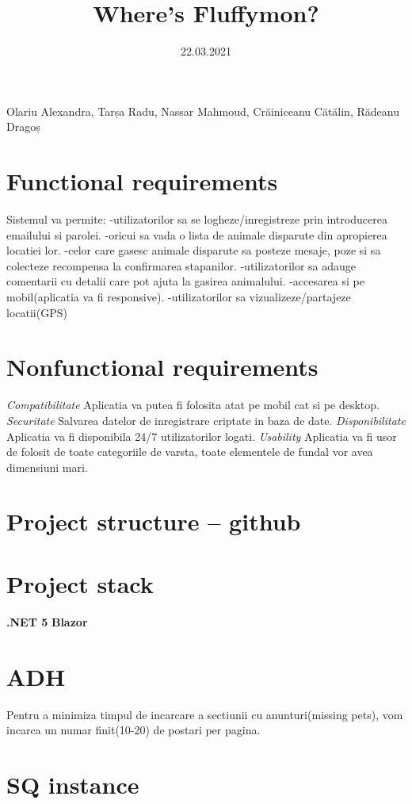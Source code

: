 \documentclass[a4paper,12pt]{article}
\begin{document}
\title{Where's Fluffymon?}
\date{ 22.03.2021}
\maketitle
\begin{center}
Olariu Alexandra, Tarșa Radu, Nassar Mahmoud, Crăiniceanu Cătălin,  Rădeanu Dragoș
\end{center}
\section{Functional requirements}
Sistemul va permite:
\newline
-utilizatorilor sa se logheze/inregistreze prin introducerea emailului si parolei.\newline
-oricui sa  vada o lista de animale disparute din apropierea locatiei lor.
\newline
-celor care gasesc animale disparute sa posteze mesaje, poze si sa colecteze recompensa la confirmarea stapanilor.
\newline
-utilizatorilor sa adauge comentarii cu detalii care pot ajuta la gasirea animalului.
\newline
-accesarea si pe mobil(aplicatia va fi responsive).
\newline
-utilizatorilor sa vizualizeze/partajeze locatii(GPS)

\section{Nonfunctional requirements}
\emph{Compatibilitate}\newline
Aplicatia va putea fi folosita atat pe mobil cat si pe desktop.
\newline
\emph{Securitate}\newline
Salvarea datelor de inregistrare criptate in baza de date.
\newline
\emph{Disponibilitate}\newline
Aplicatia va fi disponibila 24/7 utilizatorilor logati.
\newline
\emph{Usability}\newline
Aplicatia va fi usor de folosit de toate categoriile de varsta, toate elementele de fundal vor avea dimensiuni mari.
\section{Project structure – github}
\section{Project stack}
\textbf{.NET 5}\newline
\textbf{ Blazor}
\section{ADH}
Pentru a minimiza timpul de incarcare a sectiunii cu anunturi(missing pets), vom incarca un numar finit(10-20) de postari per pagina.\newline

\section{SQ instance}
\end{document}
